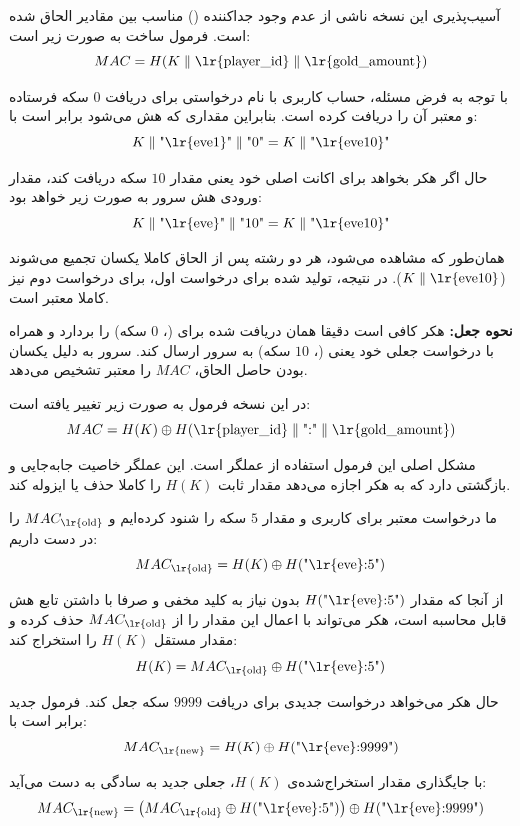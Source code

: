 آسیب‌پذیری این نسخه ناشی از عدم وجود جداکننده () مناسب بین مقادیر الحاق شده است. فرمول ساخت  به صورت زیر است:
$$MAC = H(K \parallel \text{\lr{player\_id}} \parallel \text{\lr{gold\_amount}})$$

با توجه به فرض مسئله، حساب کاربری با نام  درخواستی برای دریافت $0$ سکه فرستاده و  معتبر آن را دریافت کرده است. بنابراین مقداری که هش می‌شود برابر است با:
$$K \parallel \text{"\lr{eve1}"} \parallel \text{"0"} = K \parallel \text{"\lr{eve10}"}$$

حال اگر هکر بخواهد برای اکانت اصلی خود یعنی  مقدار $10$ سکه دریافت کند، مقدار ورودی هش سرور به صورت زیر خواهد بود:
$$K \parallel \text{"\lr{eve}"} \parallel \text{"10"} = K \parallel \text{"\lr{eve10}"}$$

همان‌طور که مشاهده می‌شود، هر دو رشته پس از الحاق کاملا یکسان تجمیع می‌شوند ($K \parallel \text{\lr{eve10}}$). در نتیجه،  تولید شده برای درخواست اول، برای درخواست دوم نیز کاملا معتبر است. 

\textbf{نحوه جعل:} هکر کافی است دقیقا همان  دریافت شده برای (، $0$ سکه) را بردارد و همراه با درخواست جعلی خود یعنی (، $10$ سکه) به سرور ارسال کند. سرور به دلیل یکسان بودن حاصل الحاق، $MAC$ را معتبر تشخیص می‌دهد.


در این نسخه فرمول به صورت زیر تغییر یافته است:
$$MAC = H(K) \oplus H(\text{\lr{player\_id}} \parallel \text{":"} \parallel \text{\lr{gold\_amount}})$$

مشکل اصلی این فرمول استفاده از عملگر  است. این عملگر خاصیت جابه‌جایی و بازگشتی دارد که به هکر اجازه می‌دهد مقدار ثابت $H(K)$ را کاملا حذف یا ایزوله کند.

ما درخواست معتبر برای کاربری  و مقدار $5$ سکه را شنود کرده‌ایم و $MAC_{\text{\lr{old}}}$ را در دست داریم:
$$MAC_{\text{\lr{old}}} = H(K) \oplus H(\text{"\lr{eve}:5"})$$

از آنجا که مقدار $H(\text{"\lr{eve}:5"})$ بدون نیاز به کلید مخفی و صرفا با داشتن تابع هش قابل محاسبه است، هکر می‌تواند با اعمال  این مقدار را از $MAC_{\text{\lr{old}}}$ حذف کرده و مقدار مستقل $H(K)$ را استخراج کند:
$$H(K) = MAC_{\text{\lr{old}}} \oplus H(\text{"\lr{eve}:5"})$$

حال هکر می‌خواهد درخواست جدیدی برای دریافت $9999$ سکه جعل کند. فرمول  جدید برابر است با:
$$MAC_{\text{\lr{new}}} = H(K) \oplus H(\text{"\lr{eve}:9999"})$$

با جایگذاری مقدار استخراج‌شده‌ی $H(K)$،  جعلی جدید به سادگی به دست می‌آید:
$$MAC_{\text{\lr{new}}} = \left( MAC_{\text{\lr{old}}} \oplus H(\text{"\lr{eve}:5"}) \right) \oplus H(\text{"\lr{eve}:9999"})$$


